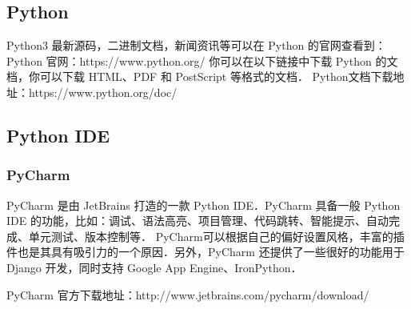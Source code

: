 
\begin{issues}
\issueDraft
\issueTODO
\end{issues}

\subsection{Python}

Python3 最新源码，二进制文档，新闻资讯等可以在 Python 的官网查看到：
Python 官网：https://www.python.org/
你可以在以下链接中下载 Python 的文档，你可以下载 HTML、PDF 和 PostScript 等格式的文档．
Python文档下载地址：https://www.python.org/doc/

\subsection{Python IDE}
\subsubsection{PyCharm}

PyCharm 是由 JetBrains 打造的一款 Python IDE．PyCharm 具备一般 Python IDE 的功能，比如：调试、语法高亮、项目管理、代码跳转、智能提示、自动完成、单元测试、版本控制等． PyCharm可以根据自己的偏好设置风格，丰富的插件也是其具有吸引力的一个原因．另外，PyCharm 还提供了一些很好的功能用于 Django 开发，同时支持 Google App Engine、IronPython．

PyCharm 官方下载地址：http://www.jetbrains.com/pycharm/download/
